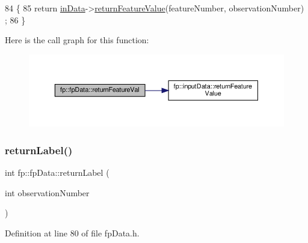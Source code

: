 \begin{DoxyCode}
84                                                                                                 \{
85                 \textcolor{keywordflow}{return} \hyperlink{classfp_1_1fpData_a49d7c3f58bcf88843c25b1b0c9714ebe}{inData}->\hyperlink{classfp_1_1inputData_af52ac3512ee8f6e973799e024ddbf629}{returnFeatureValue}(featureNumber, observationNumber)
      ;
86             \}
\end{DoxyCode}
Here is the call graph for this function\+:
\nopagebreak
\begin{figure}[H]
\begin{center}
\leavevmode
\includegraphics[width=350pt]{classfp_1_1fpData_a6b359086ec1e5c534095600e2ed5575f_cgraph}
\end{center}
\end{figure}
\mbox{\label{classfp_1_1fpData_aac722f51424cb7f6ab7d89525f82cc72}} 
\subsubsection{\texorpdfstring{return\+Label()}{returnLabel()}}
{\footnotesize\ttfamily int fp\+::fp\+Data\+::return\+Label (\begin{DoxyParamCaption}\item[{int}]{observation\+Number }\end{DoxyParamCaption})\hspace{0.3cm}{\ttfamily [inline]}}



Definition at line 80 of file fp\+Data.\+h.


